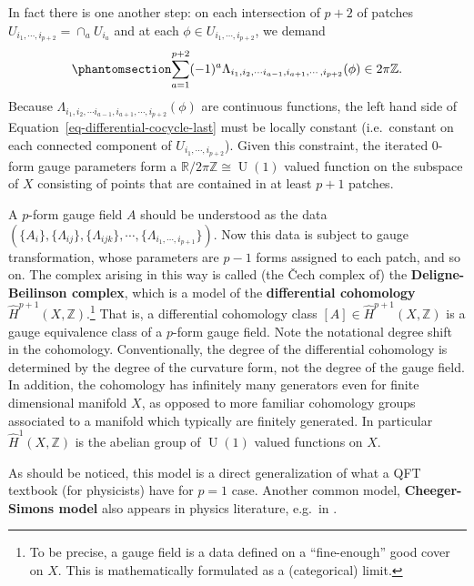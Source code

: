 \documentclass[11pt,toc=bibliography]{scrbook}
\DeclareMathOperator{\U}{U}
\numberwithin{equation}{section}
\DeclareMathOperator{\U}{U}
\begin{document}
In fact there is one another step: on each intersection of \(p+2\) of
patches \(U_{i_1,\cdots,i_{p+2}} = \cap_a U_{i_a}\) and at each
\(\phi\in U_{i_1,\cdots,i_{p+2}}\), we demand
\begin{equation}\phantomsection\label{eq-differential-cocycle-last}{ \sum_{a=1}^{p+2} (-1)^a \Lambda_{i_{1},i_2,\cdots i_{a-1},i_{a+1},\cdots,i_{p+2}}(\phi) \in 2\pi\mathbb{Z}.
}\end{equation} Because
\(\Lambda_{i_{1},i_2,\cdots i_{a-1},i_{a+1},\cdots,i_{p+2}}(\phi)\) are
continuous functions, the left hand side of
Equation~\ref{eq-differential-cocycle-last} must be locally constant
(i.e.~constant on each connected component of
\(U_{i_1,\cdots,i_{p+2}}\)). Given this constraint, the iterated 0-form
gauge parameters form a \(\mathbb{R}/2\pi\mathbb{Z}\cong\U(1)\) valued
function on the subspace of \(X\) consisting of points that are
contained in at least \(p+1\) patches.

A \(p\)-form gauge field \(A\) should be understood as the data
\((\{A_i\},\{\Lambda_{ij}\},\{\Lambda_{ijk}\},\cdots,\{\Lambda_{i_1,\cdots,i_{p+1}}\})\).
Now this data is subject to gauge transformation, whose parameters are
\(p-1\) forms assigned to each patch, and so on. The complex arising in
this way is called (the Čech complex of) the \textbf{Deligne-Beilinson
complex}, which is a model of the \textbf{differential cohomology}
\(\hat{H}^{p+1}(X,\mathbb{Z})\).\footnote{To be precise, a gauge field
  is a data defined on a ``fine-enough'' good cover on \(X\). This is
  mathematically formulated as a (categorical) limit.} That is, a
differential cohomology class \([A]\in\hat{H}^{p+1}(X,\mathbb{Z})\) is a
gauge equivalence class of a \(p\)-form gauge field. Note the notational
degree shift in the cohomology. Conventionally, the degree of the
differential cohomology is determined by the degree of the curvature
form, not the degree of the gauge field. In addition, the cohomology has
infinitely many generators even for finite dimensional manifold \(X\),
as opposed to more familiar cohomology groups associated to a manifold
which typically are finitely generated. In particular
\(\hat{H}^1(X,\mathbb{Z})\) is the abelian group of \(\U(1)\) valued
functions on \(X\).

As should be noticed, this model is a direct generalization of what a
QFT textbook (for physicists) have for \(p=1\) case. Another common
model, \textbf{Cheeger-Simons model} also appears in physics literature,
e.g.~in \autocite{Belov:2006jd,Hsieh:2020jpj}.
\end{document}
